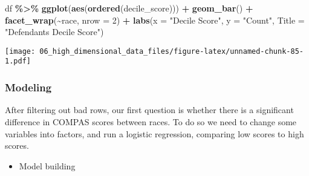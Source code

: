 \documentclass[
]{book}
\newenvironment{Shaded}{\begin{snugshade}}{\end{snugshade}}
\newcommand{\DataTypeTok}[1]{\textcolor[rgb]{0.13,0.29,0.53}{#1}}
\newcommand{\DecValTok}[1]{\textcolor[rgb]{0.00,0.00,0.81}{#1}}
\newcommand{\KeywordTok}[1]{\textcolor[rgb]{0.13,0.29,0.53}{\textbf{#1}}}
\newcommand{\NormalTok}[1]{#1}
\newcommand{\OperatorTok}[1]{\textcolor[rgb]{0.81,0.36,0.00}{\textbf{#1}}}
\newcommand{\StringTok}[1]{\textcolor[rgb]{0.31,0.60,0.02}{#1}}
\providecommand{\tightlist}{%
  \setlength{\itemsep}{0pt}\setlength{\parskip}{0pt}}
\begin{document}
\begin{Shaded}
\begin{Highlighting}[]
\NormalTok{df }\OperatorTok{\%\textgreater{}\%}
\StringTok{  }\KeywordTok{ggplot}\NormalTok{(}\KeywordTok{aes}\NormalTok{(}\KeywordTok{ordered}\NormalTok{(decile\_score))) }\OperatorTok{+}\StringTok{ }
\StringTok{          }\KeywordTok{geom\_bar}\NormalTok{() }\OperatorTok{+}
\StringTok{          }\KeywordTok{facet\_wrap}\NormalTok{(}\OperatorTok{\textasciitilde{}}\NormalTok{race, }\DataTypeTok{nrow =} \DecValTok{2}\NormalTok{) }\OperatorTok{+}
\StringTok{          }\KeywordTok{labs}\NormalTok{(}\DataTypeTok{x =} \StringTok{"Decile Score"}\NormalTok{,}
               \DataTypeTok{y =} \StringTok{"Count"}\NormalTok{,}
               \DataTypeTok{Title =} \StringTok{"Defendant\textquotesingle{}s Decile Score"}\NormalTok{)}
\end{Highlighting}
\end{Shaded}

\texttt{[image: 06\_high\_dimensional\_data\_files/figure-latex/unnamed-chunk-85-1.pdf]}

\hypertarget{modeling}{%
\subsubsection{Modeling}\label{modeling}}

After filtering out bad rows, our first question is whether there is a significant difference in COMPAS scores between races. To do so we need to change some variables into factors, and run a logistic regression, comparing low scores to high scores.

\begin{itemize}
\tightlist
\item
  Model building
\end{itemize}
\end{document}
